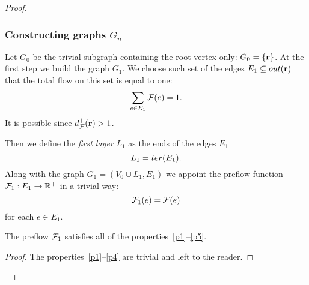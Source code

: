 \documentclass[12pt]{amsart}
\begin{document}
\begin{proof}
      \subsubsection*{Constructing graphs $G_n$}
      Let $G_0$ be the trivial subgraph containing the root vertex only: $G_0 = \left\{\mathbf{r}\right\}$.
      At the first step we build the graph $G_1$.
      We choose such set of the edges $E_1 \subseteq out(\mathbf{r})$ that the total flow on this set is equal to one:
      \[
        \sum_{e \in E_1} \mathcal{F}(e) = 1.
      \]
      It is possible since $d^{+}_{\mathcal{F}}(\mathbf{r}) > 1$.

      Then we define the \emph{first layer} $L_1$ as the ends of the edges $E_1$
      \[
        L_1 = ter(E_1).
      \]
      Along with the graph $G_1 = (V_0 \cup L_1, E_1)$ we appoint the preflow function $\mathcal{F}_{1}: E_1 \to \mathbb{R}^{+}$ in a trivial way:
      \[
        \mathcal{F}_{1}(e) = \mathcal{F}(e)
      \]
        for each $e \in E_1$.
      \begin{prop}
        The preflow $\mathcal{F}_{1}$ satisfies all of the properties~\ref{p1}--\ref{p5}.
      \end{prop}
      \begin{proof}
        The properties~\ref{p1}--\ref{p4} are trivial and left to the reader.


\end{proof}
\end{proof}
\end{document}
